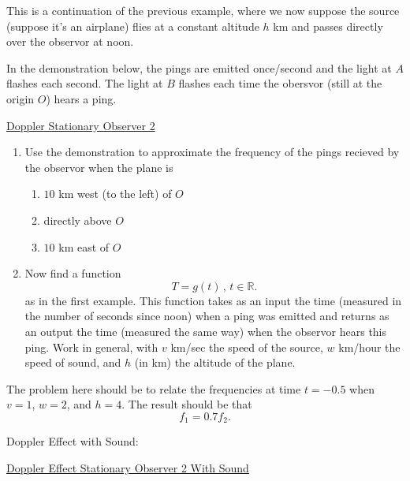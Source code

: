 \documentclass{ximera}
\begin{document}
\begin{example} \label{ExLKDmdfRE}
This is a continuation of the previous example, where we now suppose the source (suppose it's an airplane) flies at a constant altitude $h$ km and passes directly over the observor at noon. 

In the demonstration below, the pings are emitted once/second and the light at $A$ flashes each second. The light at $B$ flashes each time the obersvor (still at the origin $O$) hears a ping.

\begin{onlineOnly}
    \begin{center}
\end{center}
\end{onlineOnly}

\href{https://www.desmos.com/calculator/ow5li8h6o6}{Doppler Stationary Observer 2}

\begin{enumerate}
\item Use the demonstration to approximate the frequency of the pings recieved by the observor when the plane is 
\begin{enumerate}
\item $10$ km west (to the left) of $O$

\item directly above $O$

\item $10$ km east of $O$
\end{enumerate} 

\item Now find a function
\[
    T = g(t) \, , \, t \in \mathbb{R}.
\]
as in the first example. This function takes as an input the time (measured in the number of seconds since noon) when a ping was emitted and returns as an output the time (measured the same way) when the observor hears this ping. Work in general, with $v$ km/sec the speed of the source, $w$ km/hour the speed of sound, and $h$ (in km) the altitude of the plane.
\end{enumerate}


The problem here should be to relate the frequencies at time $t=-0.5$ when $v=1$, $w=2$, and $h=4$. The result should be that 
\[
    f_1 = 0.7 f_2 . 
\]




Doppler Effect with Sound:

\begin{onlineOnly}
    \begin{center}
\end{center}
\end{onlineOnly}

\href{https://www.desmos.com/calculator/gxzmjpgkrr}{Doppler Effect Stationary Observer 2 With Sound}


\end{example}
\end{document}
